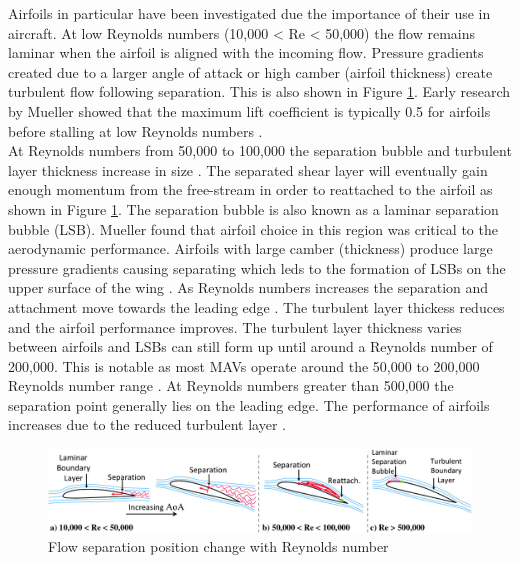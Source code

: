 Airfoils in particular have been investigated due the importance of their use in aircraft. At low Reynolds numbers (10,000 < Re < 50,000) the flow remains laminar when the airfoil is aligned with the incoming flow. Pressure gradients created due to a larger angle of attack or high camber (airfoil thickness) create turbulent flow following separation. This is also shown in Figure \ref{fig:Re3}. Early research by Mueller showed that the maximum lift coefficient is typically 0.5 for airfoils before stalling at low Reynolds numbers \cite{Mueller1985}. \\
At Reynolds numbers from 50,000 to 100,000 the separation bubble and turbulent layer thickness increase in size \cite{Winslow2018}. The separated shear layer will eventually gain enough momentum from the free-stream in order to reattached to the airfoil as shown in Figure \ref{fig:Re3}. The separation bubble is also known as a laminar separation bubble (LSB). Mueller found that airfoil choice in this region was critical to the aerodynamic performance. Airfoils with large camber (thickness) produce large pressure gradients causing separating which leds to the formation of LSBs on the upper surface of the wing \cite{Mueller1985}. As Reynolds numbers increases the separation and attachment move towards the leading edge \cite{Winslow2018}. The turbulent layer thickess reduces and the airfoil performance improves. The turbulent layer thickness varies between airfoils and LSBs can still form up until around a Reynolds number of 200,000. This is notable as most MAVs operate around the 50,000 to 200,000 Reynolds number range \cite{Cosyn2006}. At Reynolds numbers greater than 500,000 the separation point generally lies on the leading edge. The performance of airfoils increases due to the reduced turbulent layer \cite{Winslow2018}. %

\begin{figure}[H]
    \centering
    \includegraphics[width = \linewidth]{02_Background/Figs/airfoil.jpeg}
   \caption{Flow separation position change with Reynolds number \cite{Winslow2018}}
    \label{fig:Re3}
\end{figure}

